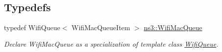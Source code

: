 \subsection*{Typedefs}
\begin{DoxyCompactItemize}
\item 
typedef Wifi\+Queue$<$ Wifi\+Mac\+Queue\+Item $>$ \hyperlink{namespacens3_a3ca96bcdf02c0e7cacea08ca62ead54c}{ns3\+::\+Wifi\+Mac\+Queue}
\begin{DoxyCompactList}\small\item\em Declare Wifi\+Mac\+Queue as a specialization of template class \hyperlink{classns3_1_1WifiQueue}{Wifi\+Queue}. \end{DoxyCompactList}\end{DoxyCompactItemize}
